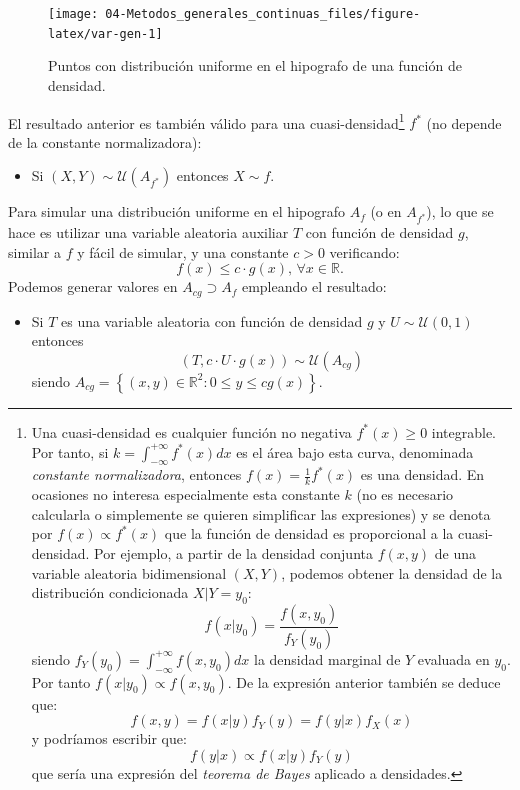 \documentclass[
  10pt,
]{book}
\providecommand{\tightlist}{%
  \setlength{\itemsep}{0pt}\setlength{\parskip}{0pt}}
\theoremstyle{break}
\theoremstyle{nonumberplain}
\let\oldfootnote\footnote
\renewcommand\footnote[1]{\oldfootnote{\hspace{2mm}#1}}
\begin{document}
\begin{figure}[!htbp]

{\centering \texttt{[image: 04-Metodos\_generales\_continuas\_files/figure-latex/var-gen-1]} 

}

\caption{Puntos con distribución uniforme en el hipografo de una función de densidad.}\label{fig:var-gen}
\end{figure}

El resultado anterior es también válido para una cuasi-densidad\footnote{Una cuasi-densidad es cualquier función no negativa \(f^{\ast}(x) \geq 0\) integrable. Por tanto, si \(k = \int_{-\infty}^{+\infty}f^{\ast}(x)dx\) es el área bajo esta curva, denominada \emph{constante normalizadora}, entonces \(f(x) = \frac{1}{k}f^{\ast}(x)\) es una densidad.
  En ocasiones no interesa especialmente esta constante \(k\) (no es necesario calcularla o simplemente se quieren simplificar las expresiones) y se denota por \(f(x) \propto f^{\ast}(x)\) que la función de densidad es proporcional a la cuasi-densidad.
  Por ejemplo, a partir de la densidad conjunta \(f(x, y)\) de una variable aleatoria bidimensional \((X, Y)\), podemos obtener la densidad de la distribución condicionada \(X|Y=y_0\):
  \[f(x | y_0) = \frac{f(x, y_0)}{f_Y(y_0)}\]
  siendo \(f_Y(y_0) = \int_{-\infty}^{+\infty}f(x, y_0)dx\) la densidad marginal de \(Y\) evaluada en \(y_0\). Por tanto \(f(x | y_0) \propto f(x, y_0)\).
  De la expresión anterior también se deduce que:
  \[f(x, y) = f(x | y)f_Y(y) = f(y | x)f_X(x)\]
  y podríamos escribir que:
  \[f(y | x) \propto f(x | y)f_Y(y)\]
  que sería una expresión del \emph{teorema de Bayes} aplicado a densidades.} \(f^{\ast}\) (no depende de la constante normalizadora):

\begin{itemize}
\tightlist
\item
  Si \(\left( X,Y\right) \sim \mathcal{U}\left(A_{f^{\ast}}\right)\) entonces \(X\sim f\).
\end{itemize}

Para simular una distribución uniforme en el hipografo \(A_{f}\) (o en \(A_{f^{\ast}}\)), lo que se hace es utilizar una variable aleatoria auxiliar \(T\) con función de densidad \(g\), similar a \(f\) y fácil de simular, y una constante \(c > 0\) verificando:
\[f(x) \leq c\cdot g(x) \text{, }\forall x\in \mathbb{R}.\]
Podemos generar valores en \(A_{cg} \supset A_{f}\) empleando el resultado:

\begin{itemize}
\tightlist
\item
  Si \(T\) es una variable aleatoria con función de densidad \(g\)
  y \(U \sim \mathcal{U}(0, 1)\) entonces
  \[\left( T,c\cdot U\cdot g(x) \right) \sim \mathcal{U}\left(
  A_{cg}\right)\]
  siendo
  \(A_{cg}=\left\{ \left( x, y \right) \in \mathbb{R}^{2} : 0 \leq y \leq cg\left( x \right) \right\}\).
\end{itemize}
\end{document}
